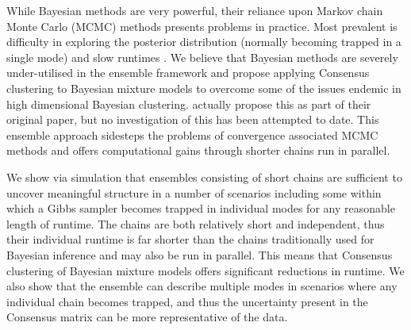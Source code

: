 \documentclass{bioinfo}
\begin{document}


While Bayesian methods are very powerful, their reliance upon Markov chain Monte Carlo (MCMC) methods presents problems in practice. Most prevalent is difficulty in exploring the posterior distribution (normally becoming trapped in a single mode) and slow runtimes \citep[for a description of these and other problems, please see][]{robert2018accelerating, yao2020stacking, chandra2020bayesian}. We believe that Bayesian methods are severely under-utilised in the ensemble framework and propose applying Consensus clustering to Bayesian mixture models to overcome some of the issues endemic in high dimensional Bayesian clustering. \cite{monti2003consensus} actually propose this as part of their original paper, but no investigation of this has been attempted to date. This ensemble approach  sidesteps the problems of convergence associated MCMC methods and offers computational gains through shorter chains run in parallel. 

We show via simulation that ensembles consisting of short chains are sufficient to uncover meaningful structure in a number of scenarios including some within which a Gibbs sampler becomes trapped in individual modes for any reasonable length of runtime. The chains are both relatively short and independent, thus their individual runtime is far shorter than the chains traditionally used for Bayesian inference and may also be run in parallel. This means that Consensus clustering of Bayesian mixture models offers significant reductions in runtime. We also show that the ensemble can describe multiple modes in scenarios where any individual chain becomes trapped, and thus the uncertainty present in the Consensus matrix can be more representative of the data.
\end{document}
